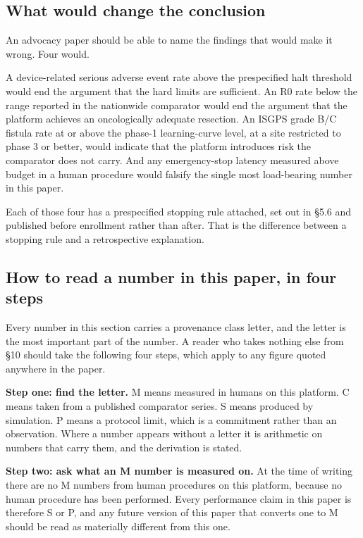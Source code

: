 \subsection{What would change the conclusion}

An advocacy paper should be able to name the findings that would make it wrong.
Four would.

A device-related serious adverse event rate above the prespecified halt
threshold would end the argument that the hard limits are sufficient. An R0 rate
below the range reported in the nationwide comparator would end the argument
that the platform achieves an oncologically adequate resection. An ISGPS grade
B/C fistula rate at or above the phase-1 learning-curve level, at a site
restricted to phase 3 or better, would indicate that the platform introduces
risk the comparator does not carry. And any emergency-stop latency measured
above budget in a human procedure would falsify the single most load-bearing
number in this paper.

Each of those four has a prespecified stopping rule attached, set out in \S 5.6
and published before enrollment rather than after. That is the difference
between a stopping rule and a retrospective explanation.

\subsection{How to read a number in this paper, in four steps}

Every number in this section carries a provenance class letter, and the letter
is the most important part of the number. A reader who takes nothing else from
\S 10 should take the following four steps, which apply to any figure quoted
anywhere in the paper.

\textbf{Step one: find the letter.} M means measured in humans on this platform.
C means taken from a published comparator series. S means produced by
simulation. P means a protocol limit, which is a commitment rather than an
observation. Where a number appears without a letter it is arithmetic on
numbers that carry them, and the derivation is stated.

\textbf{Step two: ask what an M number is measured on.} At the time of writing
there are no M numbers from human procedures on this platform, because no human
procedure has been performed. Every performance claim in this paper is
therefore S or P, and any future version of this paper that converts one to M
should be read as materially different from this one.

